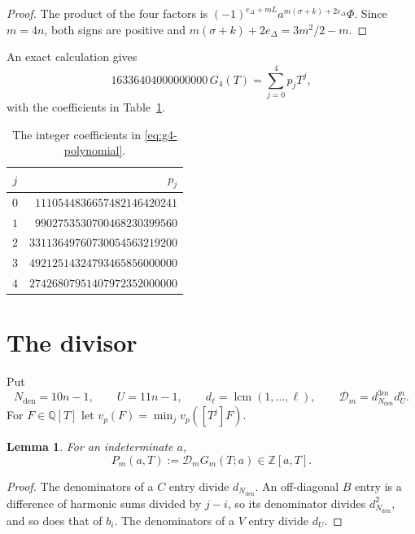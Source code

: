 \documentclass{amsart}
\newtheorem{lemma}{Lemma}[section]
\numberwithin{equation}{section}
\numberwithin{table}{section}
\newcommand{\Z}{\mathbb{Z}}
\begin{document}
\begin{proof}
The product of the four factors is
$(-1)^{e_\Delta+mL}a^{m(\sigma+k)+2e_\Delta}\Phi$. Since
$m=4n$, both signs are positive and
$m(\sigma+k)+2e_\Delta=3m^2/2-m$.
\end{proof}

An exact calculation gives
\begin{equation}\label{eq:g4-polynomial}
16336404000000000\,G_4(T)=\sum_{j=0}^4p_jT^j,
\end{equation}
with the coefficients in Table~\ref{tab:g4-coefficients}.
\begin{table}[ht]
\centering
\caption{The integer coefficients in \eqref{eq:g4-polynomial}.}
\label{tab:g4-coefficients}
\begin{tabular}{cr}
$j$&$p_j$\\\hline
$0$ & $1110544836657482146420241$\\
$1$ & $9902753530700468230399560$\\
$2$ & $33113649760730054563219200$\\
$3$ & $49212514324793465856000000$\\
$4$ & $27426807951407972352000000$\\
\end{tabular}
\end{table}

\section{The divisor}\label{sec:divisor}
Put
\[
N_{\mathrm{den}}=10n-1,\qquad U=11n-1,\qquad d_\ell=\operatorname{lcm}(1,\ldots,\ell),
 \qquad \mathcal D_m=d_{N_{\mathrm{den}}}^{3m}d_U^n.
\]
For $F\in\mathbb Q[T]$ let $v_p(F)=\min_j v_p([T^j]F)$.

\begin{lemma}\label{lem:common-denominator}
For an indeterminate $a$,
\begin{equation}\label{eq:lcm-clearer}
 P_m(a,T):=\mathcal D_mG_m(T;a)\in\Z[a,T].
\end{equation}
\end{lemma}
\begin{proof}
The denominators of a $C$ entry divide $d_{N_{\mathrm{den}}}$. An off-diagonal $B$ entry is
a difference of harmonic sums divided by $j-i$, so its denominator divides
$d_{N_{\mathrm{den}}}^2$, and so does that of $b_i$. The denominators of a $V$ entry divide
$d_U$.
\end{proof}
\end{document}
